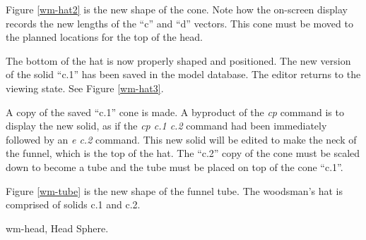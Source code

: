 
Figure \ref{wm-hat2} is the new shape of the cone.
Note how the on-screen display records the new lengths of the ``c''
and ``d'' vectors.
This cone must be moved to the planned locations for the top of the head.


The bottom of the hat is now properly shaped and positioned.  The
new version of the solid ``c.1'' has been saved in the model database.
The editor returns to the viewing state.  See Figure \ref{wm-hat3}.

A copy of the saved ``c.1'' cone is made.  A byproduct of the {\em cp}
command is to display the new solid, as if the {\em cp c.1 c.2} command
had been immediately followed by an {\em e c.2} command.
This new solid will be edited to make the neck of the funnel,
which is the top of the hat.
The ``c.2'' copy of the cone must be
scaled down to become a tube and the tube must be placed on top of the 
cone ``c.1''.


Figure \ref{wm-tube} is the new shape of the funnel tube.
The woodsman's hat is comprised of solids c.1 and c.2.

\mfig wm-head, Head Sphere.
